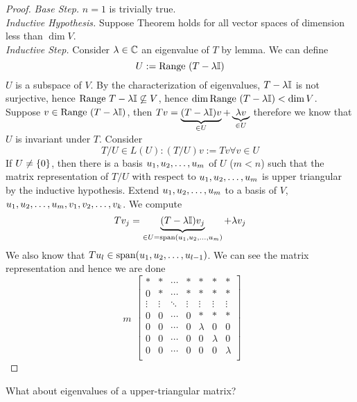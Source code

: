 \begin{proof} 
    \textit{Base Step.} $n = 1$ is trivially true. \\
    \textit{Inductive Hypothesis.} Suppose Theorem holds for all vector spaces of dimension less than $\dim V$. \\
    \textit{Inductive Step.} Consider $\lambda \in \mathbb C$ an eigenvalue of $T$ by lemma. We can define \[U := \text{Range } (T  -\lambda \mathbb I)\] $U$ is a subspace of $V$. By the characterization of eigenvalues, $T - \lambda \mathbb I$ is not surjective, hence $\text{Range } T - \lambda \mathbb I \not\subseteq V$, hence $\dim \text{Range } (T - \lambda \mathbb I) < \dim V$. Suppose $v \in \text{Range } (T - \lambda \mathbb I)$, then $Tv = \underbrace{(T - \lambda \mathbb I)v}_{\in U} + \underbrace{\lambda v}_{\in U}$ therefore we know that $U$ is invariant under $T$. Consider \[T/U \in L(U) : (T/U)v := Tv \forall v \in U\] If $U \neq \left\{ 0 \right\}$, then there is a basis ${u}_1,{u}_2, \ldots, {u}_{m}$ of $U$ ($m < n$) such that the matrix representation of $T/U$ with respect to ${u}_1,{u}_2, \ldots, {u}_{m}$ is upper triangular by the inductive hypothesis. Extend ${u}_1,{u}_2, \ldots, {u}_{m}$ to a basis of $V$, ${u}_1,{u}_2, \ldots, {u}_{m}, {v}_1,{v}_2, \ldots, {v}_{k}$. We compute
    \[Tv_j = \underbrace{(T - \lambda \mathbb I)v_j}_{\in U = \text{span} ({u}_1,{u}_2, \ldots, {u}_{m})} + \lambda v_j\] We also know that $Tu_l \in \text{span} ({u}_1,{u}_2, \ldots, {u}_{l-1})$. We can see the matrix representation and hence we are done
    \[ \begin{array}{cc}
         \\ \\ \\ \\ m \\ \\ \\ 
    \end{array}\left[\begin{array}{cccc|ccccccc}
         * & * & \cdots & * & * & * & * \\
         0 & * & \cdots & * & * & * & * \\
         \vdots & \vdots & \ddots & \vdots & \vdots & \vdots & \vdots \\
         0 & 0 & \cdots & 0 & * & * & * \\
         \hline
         0 & 0 & \cdots & 0 & \lambda & 0 & 0 \\
         0 & 0 & \cdots & 0 & 0 & \lambda & 0 \\
         0 & 0 & \cdots & 0 & 0 & 0 & \lambda \\
    \end{array}\right]\]
\end{proof}
\begin{question}
    What about eigenvalues of a upper-triangular matrix?
\end{question}
